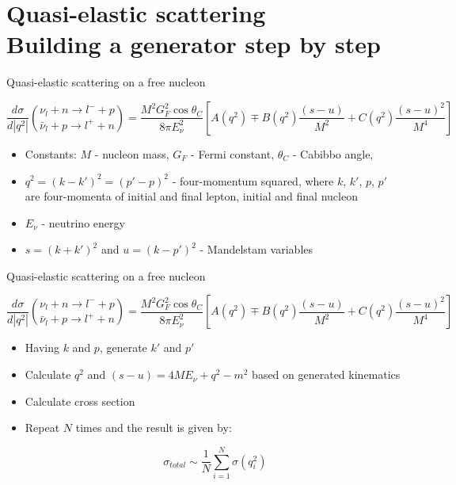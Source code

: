 \section[toc=Quasi-elastic scattering]{Quasi-elastic scattering \\ \small{Building a generator step by step}}

\begin{wideslide}[toc=QEL on free N]{Quasi-elastic scattering on a free nucleon}
\null\vfill

  
  $$\frac{d\sigma}{d|q^2|} {{\nu_l + n \rightarrow l^- + p}\choose{\bar\nu_l + p \rightarrow l^+ + n}} = \frac{M^2G_F^2\cos\theta_C}{8\pi E_\nu^2}\left[A(q^2) \mp B(q^2)\frac{(s - u)}{M^2} + C(q^2)\frac{(s - u)^2}{M^4}\right]$$
  
  
  \begin{itemize}
    \item Constants: $M$ - nucleon mass, $G_F$ - Fermi constant, $\theta_C$ - Cabibbo angle,
    \item $q^2 = (k - k')^2 = (p' - p)^2$ - four-momentum squared, where $k$, $k'$, $p$, $p'$ are four-momenta of initial and final lepton, initial and final nucleon
    \item $E_\nu$ - neutrino energy
    \item $s = (k + k')^2$ and $u = (k - p')^2$ - Mandelstam variables
  \end{itemize}

  
\vfill\null
\end{wideslide}

\begin{wideslide}[toc=]{Quasi-elastic scattering on a free nucleon}
\null\vfill

  
  $$\frac{d\sigma}{d|q^2|} {{\nu_l + n \rightarrow l^- + p}\choose{\bar\nu_l + p \rightarrow l^+ + n}} = \frac{M^2G_F^2\cos\theta_C}{8\pi E_\nu^2}\left[A(q^2) \mp B(q^2)\frac{(s - u)}{M^2} + C(q^2)\frac{(s - u)^2}{M^4}\right]$$
  
  
  \begin{itemize}
    \item Having $k$ and $p$, generate $k'$ and $p'$
    \item Calculate $q^2$ and $(s - u) = 4ME_\nu + q^2 -m^2$ based on generated kinematics
    \item Calculate cross section
    \item Repeat $N$ times and the result is given by: 
    
    $$\sigma_{total} \sim \frac{1}{N} \sum\limits_{i = 1}^N \sigma (q_i^2)$$
    
  \end{itemize}

\vfill\null
\end{wideslide}

